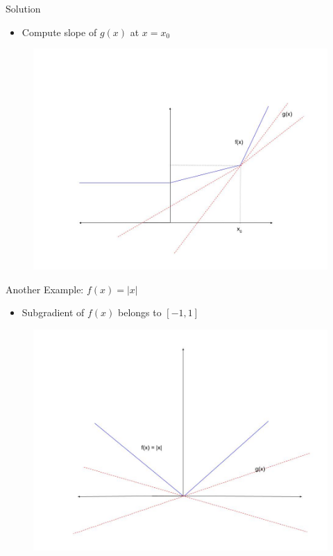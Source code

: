 \documentclass{beamer}
\begin{document}
\begin{frame}{Solution}

\begin{itemize}
\item Compute slope of $g(x)$ at $x = x_0$
\end{itemize}
\begin{figure}
\centering
\includegraphics[scale = 0.25]{../assets/lasso-regression/diagrams/subgradient_2.jpg}

\label{fig:my_label}
\end{figure}
\end{frame}

\begin{frame}{Another Example: $f(x) = |x|$}

\begin{itemize}
\item Subgradient of $f(x)$ belongs to $[-1, 1]$
\end{itemize}
\begin{figure}
\centering
\includegraphics[scale = 0.25]{../assets/lasso-regression/diagrams/subgradient_3.jpg}
\label{fig:my_label}
\end{figure}
\end{frame}
\end{document}
